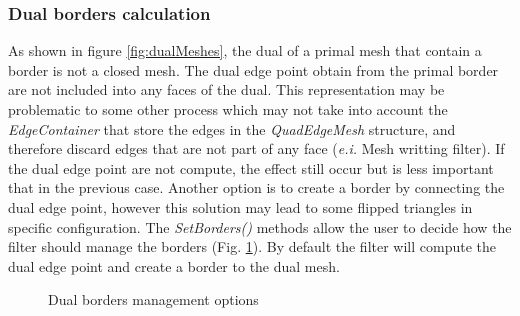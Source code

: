 \documentclass{InsightArticle}
\begin{document}
\subsubsection{Dual borders calculation}
As shown in figure \ref{fig:dualMeshes}, the dual of a primal mesh that contain a border is not a closed mesh. The dual edge point obtain from the primal border are not included into any faces of the dual. This representation may be problematic to some other process which may not take into account the \emph{EdgeContainer} that store the edges in the \emph{QuadEdgeMesh} structure, and therefore discard edges that are not part of any face (\emph{e.i.} Mesh writting filter). If the dual edge point are not compute, the effect still occur but is less important that in the previous case. Another option is to create a border by connecting the dual edge point, however this solution may lead to some flipped triangles in specific configuration. The \emph{SetBorders()} methods allow the user to decide how the filter should manage the borders (Fig. \ref{fig:BorderManagment}). By default the filter will compute the dual edge point and create a border to the dual mesh.
\begin{figure}
	\centering
	\caption{Dual borders management options}
	\label{fig:BorderManagment}
\end{figure}
\end{document}
